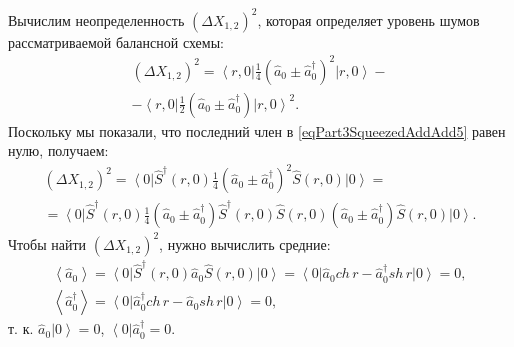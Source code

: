 Вычислим неопределенность $\left(\Delta X_{1,2}\right)^2$, которая
определяет уровень шумов рассматриваемой балансной схемы:
\begin{eqnarray}
\left(\Delta X_{1,2}\right)^2 = 
\left<r,
0\right|\frac{1}{4}\left(\hat{a}_0\pm\hat{a}_0^{\dag}\right)^2\left|r,
0\right> -
\nonumber \\
-
\left<r,
0\right|\frac{1}{2}\left(\hat{a}_0\pm\hat{a}_0^{\dag}\right)\left|r,
0\right>^2.
\label{eqPart3SqueezedAddAdd5}
\end{eqnarray}
Поскольку мы показали, что последний член в
\eqref{eqPart3SqueezedAddAdd5} равен нулю, получаем:
\begin{eqnarray}
\left(\Delta X_{1,2}\right)^2 = 
\left<0\right|\hat{S}^{\dag}\left(r, 0\right)
\frac{1}{4}\left(\hat{a}_0\pm\hat{a}_0^{\dag}\right)^2
\hat{S}\left(r, 0\right)
\left|0\right> = 
\nonumber \\
=
\left<0\right|\hat{S}^{\dag}\left(r, 0\right)
\frac{1}{4}
\left(\hat{a}_0\pm\hat{a}_0^{\dag}\right)
\hat{S}^{\dag}\left(r, 0\right)
\hat{S}\left(r, 0\right)
\left(\hat{a}_0\pm\hat{a}_0^{\dag}\right)
\hat{S}\left(r, 0\right)
\left|0\right>.
\label{eqPart3SqueezedAddAdd6}
\end{eqnarray}
Чтобы найти 
$\left(\Delta X_{1,2}\right)^2$, нужно вычислить средние:
\begin{eqnarray}
\left<\hat{a}_0\right> = 
\left<0\right|
\hat{S}^{\dag}\left(r, 0\right)
\hat{a}_0
\hat{S}\left(r, 0\right)
\left|0\right> = 
\left<0\right|
\hat{a}_0 ch\,r - \hat{a}_0^{\dag} sh\,r
\left|0\right> = 0,
\nonumber \\
\left<\hat{a}_0^{\dag}\right> = 
\left<0\right|
\hat{a}_0^{\dag} ch\,r - \hat{a}_0 sh\,r
\left|0\right> = 0,
\label{eqPart3SqueezedAddAdd7}
\end{eqnarray}
т. к. $\hat{a}_0\left|0\right> = 0$, 
$\left<0\right|\hat{a}_0^{\dag} = 0$.

